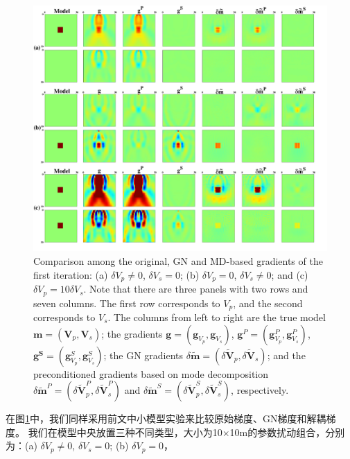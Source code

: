 \begin{figure}
    \begin{center}
        \includegraphics[width=14cm]{Figure/chapter02/Hessiantest/Fig/newepsall.pdf}
        \caption{
    Comparison among the original, GN and MD-based gradients
        of the first iteration:
    (a) $\delta V_p \neq 0$, $\delta V_s=0$; (b) $\delta V_p=0$, $\delta V_s\neq0$; and (c)
    $\delta V_p=10 \delta V_s$.
        Note that there are three panels with two rows and seven columns.
        The first row corresponds to $V_p$, and the second
                corresponds to $V_s$.
    The columns from left to right are the true model $\mathbf{m}=(\mathbf{V}_p,
    \mathbf{V}_s)$;
    the gradients $\mathbf{g}=(\mathbf{g}_{V_p},\mathbf{g}_{V_s})$,
    $\mathbf{g}^P=(\mathbf{g}^P_{V_p},\mathbf{g}^P_{V_s})$,
    $\mathbf{g^S}=(\mathbf{g}^S_{V_p},\mathbf{g}^S_{V_s})$;
    the GN gradients $\delta
    \mathbf{\tilde{m}}=(\delta\mathbf{\tilde{V}}_p,\delta\mathbf{\tilde{V}}_s)$;
        and the preconditioned gradients based on mode decomposition $\delta
        \mathbf{\tilde{m}}^P=(\delta\mathbf{\tilde{V}}^P_p,\delta\mathbf{\tilde{V}}^P_s)$
        and $\delta
        \mathbf{\tilde{m}}^S=(\delta\mathbf{\tilde{V}}^S_p,\delta\mathbf{\tilde{V}}^S_s)$, respectively.
    }
    \label{fig:all}
    \end{center}
\end{figure}
在图\ref{fig:all}中，我们同样采用前文中小模型实验来比较原始梯度、GN梯度和解耦梯度。
我们在模型中央放置三种不同类型，大小为10$\times$10m的参数扰动组合，分别为：(a) $\delta V_p \neq 0$, $\delta V_s = 0$; (b) $\delta V_p = 0$，
